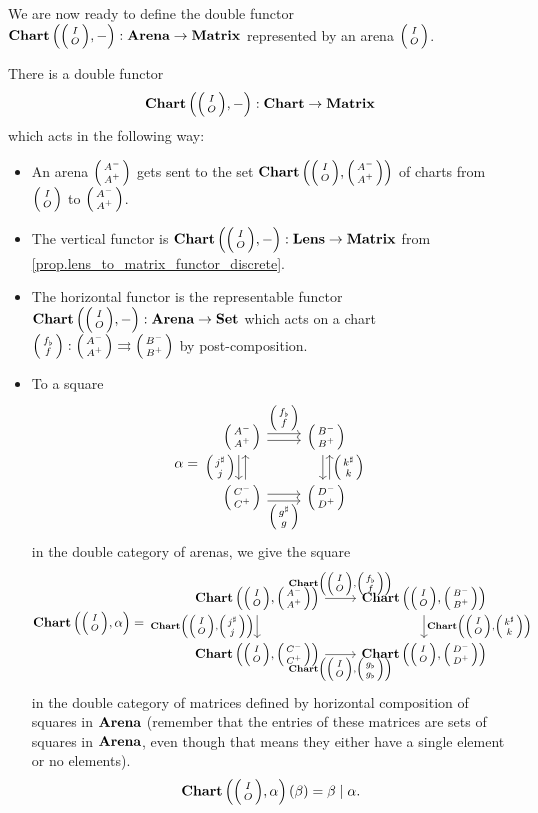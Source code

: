 \documentclass[DynamicalBook]{subfiles}
\begin{document}
We are now ready to define the double functor $\Cat{Chart}\left( \lens{I}{O}, -
\right) : \Cat{Arena} \to \Cat{Matrix}$ represented by an arena $\lens{I}{O}$.

\begin{proposition}\label{prop.representable_double_functor}
  There is a double functor
  $$\Cat{Chart}\left( \littlelens{I}{O}, -
\right) : \Cat{Chart} \to \Cat{Matrix}$$
which acts in the following way:
\begin{itemize}
  \item An arena $\lens{A^-}{A^+}$ gets sent to the set $\Cat{Chart}\left(
      \lens{I}{O}, \lens{A^-}{A^+} \right)$ of charts from $\lens{I}{O}$ to $\lens{A^-}{A^+}$.
  \item The vertical functor is $\Cat{Chart}\left( \lens{I}{O}, - \right) :
    \Cat{Lens} \to \Cat{Matrix}$ from \cref{prop.lens_to_matrix_functor_discrete}.
  \item The horizontal functor is the representable functor $\Cat{Chart}\left(
      \lens{I}{O}, - \right) : \Cat{Arena} \to \smset$ which acts on a chart
    $\lens{f_{\flat}}{f} : \lens{A^-}{A^+} \tto \lens{B^-}{B^+}$ by
    post-composition.
  \item To a square
    \[ \alpha = 
      \begin{tikzcd}
        \littlelens{A^-}{A^+} \ar[r, shift left, "\littlelens{f_{\flat}}{f}"] \ar[r, shift
        right] \ar[d, shift right, "\littlelens{j^{\sharp}}{j}"'] \ar[d, shift left,
        leftarrow] & \littlelens{B^-}{B^+} \ar[d, shift left, leftarrow,
        "\littlelens{k^{\sharp}}{k}"] \ar[d, shift right]\\
        \littlelens{C^-}{C^+} \ar[r, shift right, "\littlelens{g^{\sharp}}{g}"'] \ar[r,
        shift left] & \littlelens{D^-}{D^+}
      \end{tikzcd}
    \]
    in the double category of arenas, we give the square
    \[\Cat{Chart}\left(\littlelens{I}{O}, \alpha \right)  =
      \begin{tikzcd}
        \Cat{Chart}\left(\littlelens{I}{O}, \littlelens{A^-}{A^+} \right) \ar[r, "{\Cat{Chart}\left(\littlelens{I}{O}, \littlelens{f_{\flat}}{f} \right)}"]  \ar[d, "{\Cat{Chart}\left(\littlelens{I}{O}, \littlelens{j^{\sharp}}{j} \right)}"'] 
         &  \Cat{Chart}\left(\littlelens{I}{O}, \littlelens{B^-}{B^+} \right)\ar[d,
        "{ \Cat{Chart}\left(\littlelens{I}{O}, \littlelens{k^{\sharp}}{k} \right) }"] \\
   \Cat{Chart}\left(\littlelens{I}{O}, \littlelens{C^-}{C^+} \right)      \ar[r, "{\Cat{Chart}\left(\littlelens{I}{O}, \littlelens{g_{\flat}}{g_{\flat}} \right)}"']  & \Cat{Chart}\left(\littlelens{I}{O}, \littlelens{D^-}{D^+} \right)
      \end{tikzcd}
    \]
    in the double category of matrices defined by horizontal composition of
    squares in $\textbf{Arena}$ (remember that the entries of these matrices are
    sets of squares in $\textbf{Arena}$, even though that means they either have a
    single element or no elements).
    \begin{align*}
    \Cat{Chart}\left(\littlelens{I}{O}, \alpha \right)(\beta) = \beta \mid \alpha.
\end{align*}
\end{itemize}
\end{proposition}
\end{document}

